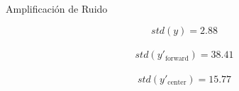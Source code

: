 \documentclass[xcolor=svgnames]{beamer} %
\theoremstyle{plain}
\theoremstyle{definition}
\begin{document}
\begin{frame}{Amplificación de Ruido}
{\begin{minipage}{.7\linewidth}
  \end{minipage} \begin{minipage}{.25\linewidth}
  	$$std(y )= 2.88$$ \\
  	$$std(y'_{\text{forward}} ) = 38.41 $$\\
  	$$std(y'_{\text{center}} ) = 15.77 $$\\
  \end{minipage}    }


\end{frame}
\end{document}
